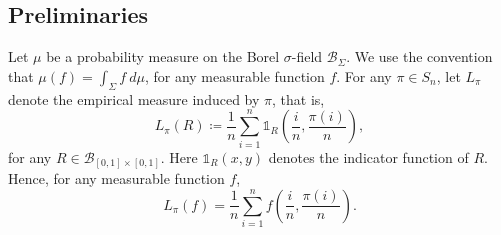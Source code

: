 \subsection{Preliminaries}\label{S2}


Let $\mu$ be a probability measure on the Borel $\sigma$-field $\mathcal{B}_{\Sigma}$. We use the convention that $\mu(f) = \int_{\Sigma} f \ d\mu$, for any measurable function $f$.
For any $\pi \in S_n$, let $L_{\pi}$ denote the empirical measure induced by $\pi$, that is,
\begin{equation}\label{eq:em}
L_{\pi}(R) \coloneqq \frac{1}{n}\sum_{i = 1}^{n} \mathds{1}_R\left( \frac{i}{n}, \frac{\pi(i)}{n} \right),
\end{equation}
for any $R \in \mathcal{B}_{[0, 1]\times[0,1]}$. Here $\mathds{1}_R(x, y)$ denotes the indicator function of $R$. Hence, for any measurable function $f$,
\[
L_{\pi}(f) = \frac{1}{n}\sum_{i=1}^{n}f\left(\frac{i}{n}, \frac{\pi(i)}{n}\right).
\]


